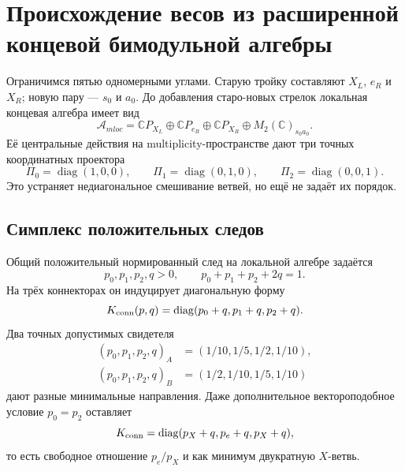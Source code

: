 \chapter{Происхождение весов из расширенной концевой бимодульной алгебры}
\label{ch:v8-baryon-c0-extended-endpoint-bimodule-weight-origin-gate}

Ограничимся пятью одномерными углами. Старую тройку составляют $X_L$,
$e_R$ и $X_R$; новую пару --- $s_0$ и $a_0$. До добавления старо-новых
стрелок локальная концевая алгебра имеет вид
\begin{equation}
 \mathcal A_{
m loc}
 =\mathbb C P_{X_L}\oplus\mathbb C P_{e_R}
 \oplus\mathbb C P_{X_R}\oplus M_2(\mathbb C)_{s_0a_0}.
 \label{eq:v8-baryon-c0-local-extended-endpoint-algebra}
\end{equation}
Её центральные действия на multiplicity-пространстве дают три точных
координатных проектора
\begin{equation}
 \Pi_0=\operatorname{diag}(1,0,0),\qquad
 \Pi_1=\operatorname{diag}(0,1,0),\qquad
 \Pi_2=\operatorname{diag}(0,0,1).
 \label{eq:v8-baryon-c0-bimodule-coordinate-projectors}
\end{equation}
Это устраняет недиагональное смешивание ветвей, но ещё не задаёт их порядок.

\section{Симплекс положительных следов}

Общий положительный нормированный след на локальной алгебре задаётся
\begin{equation}
 p_0,p_1,p_2,q>0,
 \qquad p_0+p_1+p_2+2q=1.
 \label{eq:v8-baryon-c0-local-trace-simplex}
\end{equation}
На трёх коннекторах он индуцирует диагональную форму
\begin{equation}
 K_{\rm conn}(p,q)
 =\operatorname{diag}(p_0+q,p_1+q,p_2+q).
 \label{eq:v8-baryon-c0-trace-induced-connector-weights}
\end{equation}
Два точных допустимых свидетеля
\begin{align}
 (p_0,p_1,p_2,q)_A&=(1/10,1/5,1/2,1/10),\nonumber\\
 (p_0,p_1,p_2,q)_B&=(1/2,1/10,1/5,1/10)
 \label{eq:v8-baryon-c0-two-local-trace-witnesses}
\end{align}
дают разные минимальные направления. Даже дополнительное вектороподобное
условие $p_0=p_2$ оставляет
\begin{equation}
 K_{\rm conn}=\operatorname{diag}(p_X+q,p_e+q,p_X+q),
 \label{eq:v8-baryon-c0-vectorlike-two-weight-residual}
\end{equation}
то есть свободное отношение $p_e/p_X$ и как минимум двукратную $X$-ветвь.

